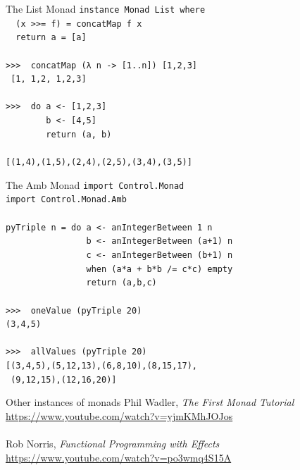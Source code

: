\documentclass{beamer}
\newcommand{\prompt}{\phantom{}>\phantom{}>\phantom{}>\ }
\begin{document}
\begin{frame}{The List Monad}
  \texttt{instance Monad List where\\ \pause
    \ \ (x >>= f) = concatMap f x \\ \pause
    \ \ return a = [a] \\ \pause
  } \ \\
  \texttt{\prompt{} concatMap (λ n -> [1..n]) [1,2,3]} \\ \pause
  \texttt{ [1, 1,2, 1,2,3] } \\ \ \\ \pause
  \texttt{\prompt{} do a <- [1,2,3] \\
    \ \ \ \ \ \ \ \ b <- [4,5] \\
    \ \ \ \ \ \ \ \ return (a, b)} \\ \pause
  \ \\
  \texttt{[(1,4),(1,5),(2,4),(2,5),(3,4),(3,5)]}
\end{frame}

\begin{frame}{The Amb Monad} \pause
  \texttt{import Control.Monad \\
    import Control.Monad.Amb \\
    \ \\
    pyTriple n = do a <- anIntegerBetween 1 n \\
    \ \ \ \ \ \ \ \ \ \ \ \ \ \ \ \ b <- anIntegerBetween (a+1) n \\
    \ \ \ \ \ \ \ \ \ \ \ \ \ \ \ \ c <- anIntegerBetween (b+1) n \\
    \ \ \ \ \ \ \ \ \ \ \ \ \ \ \ \ when (a*a + b*b /= c*c) empty \\
    \ \ \ \ \ \ \ \ \ \ \ \ \ \ \ \ return (a,b,c) \\ 
  } \pause
  \ \\
  \texttt{\prompt{} oneValue (pyTriple 20)} \\ \pause
  \texttt{(3,4,5)} \\ \pause
  \ \\
  \texttt{\prompt{} allValues (pyTriple 20)} \\ \pause
  \texttt{[(3,4,5),(5,12,13),(6,8,10),(8,15,17),\\
      \ (9,12,15),(12,16,20)]}
\end{frame}

\begin{frame}{Other instances of monads}
  Phil Wadler, \textit{The First Monad Tutorial} \\
  \url{https://www.youtube.com/watch?v=yjmKMhJOJos} \\ \pause
  \ \\
  Rob Norris, \textit{Functional Programming with Effects} \\
  \url{https://www.youtube.com/watch?v=po3wmq4S15A}
\end{frame}
\end{document}
